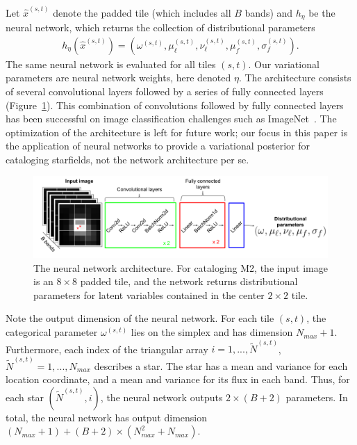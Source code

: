 Let $\hat x^{(s,t)}$ denote the padded tile (which includes all $B$ bands) and $h_\eta$ be the neural network, which returns the collection of distributional parameters
\begin{align}
    h_\eta(\hat x^{(s,t)}) = (\omega^{(s,t)}, \mu_\ell^{(s,t)}, \nu_{\ell}^{(s,t)}, \mu_f^{(s,t)}, \sigma^{(s,t)}_f).
    \label{eq:nn_output}
\end{align}
The same neural network is evaluated for all tiles $(s,t)$. Our variational parameters are neural network weights, here denoted $\eta$. 
The architecture consists of several convolutional layers followed by a series of fully connected layers (Figure~\ref{fig:starnet_arch}). 
This combination of convolutions followed by fully connected layers has been successful on image classification challenges such as ImageNet~\cite{imagenet2015}. 
The optimization of the architecture is left for future work; our focus in this paper is the application of neural networks to provide a variational posterior for cataloging starfields, not the network architecture per se. 



\begin{figure}[!tb]
    \centering
    \includegraphics[width=\textwidth]{figures/starnet_archetecture4.png}
    \vspace{-0.5cm}
    \caption{The neural network architecture. For cataloging M2, the input image is an $8\times 8$ padded tile, and the network returns distributional parameters for latent variables contained in the center $2\times 2$ tile.\\
    }
    \label{fig:starnet_arch}
\end{figure}

Note the output dimension of the neural network. For each tile $(s,t)$, the categorical parameter $\omega^{(s,t)}$
lies on the simplex and has dimension $N_{max} + 1$. 
Furthermore, each index of the triangular array
$i = 1, ..., \tilde N^{(s,t)}$, $\tilde N^{(s,t)} = 1, ..., N_{max}$
describes a star. The star has a mean and variance for each location coordinate, and a mean and variance for its flux in each band. 
Thus, for each star $(\tilde N^{(s,t)}, i)$, 
the neural network outputs $2 \times (B + 2)$ parameters. 
In total, the neural network has output dimension $(N_{max} + 1) + (B + 2) \times (N_{max}^2 + N_{max})$. 

